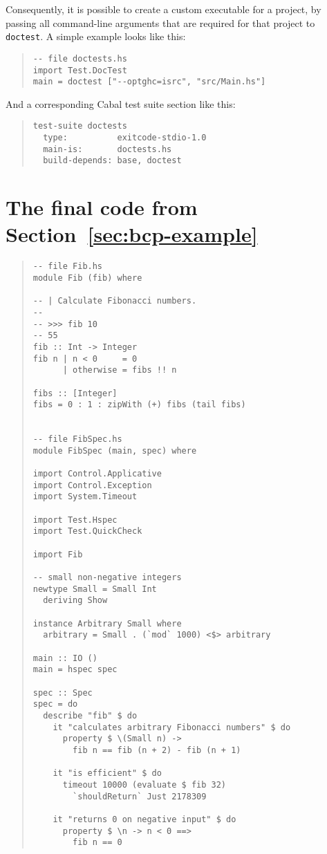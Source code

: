 \documentclass[preprint]{sigplanconf}
\begin{document}
\noindent Consequently, it is possible to create a custom executable
for a project, by passing all command-line arguments that are required
for that project to {\tt doctest}.  A simple example looks like this:

\begin{quote}
\small
\begin{verbatim}
-- file doctests.hs
import Test.DocTest
main = doctest ["--optghc=isrc", "src/Main.hs"]
\end{verbatim}
\end{quote}

\noindent And a corresponding Cabal test suite section like this:

\begin{quote}
\small
\begin{verbatim}
test-suite doctests
  type:          exitcode-stdio-1.0
  main-is:       doctests.hs
  build-depends: base, doctest
\end{verbatim}
\end{quote}

\appendix
\section{The final code from Section~\ref{sec:bcp-example}}
\label{sec:appendix-code}

\begin{quote}
\small
\begin{verbatim}
-- file Fib.hs
module Fib (fib) where

-- | Calculate Fibonacci numbers.
--
-- >>> fib 10
-- 55
fib :: Int -> Integer
fib n | n < 0     = 0
      | otherwise = fibs !! n

fibs :: [Integer]
fibs = 0 : 1 : zipWith (+) fibs (tail fibs)


-- file FibSpec.hs
module FibSpec (main, spec) where

import Control.Applicative
import Control.Exception
import System.Timeout

import Test.Hspec
import Test.QuickCheck

import Fib

-- small non-negative integers
newtype Small = Small Int
  deriving Show

instance Arbitrary Small where
  arbitrary = Small . (`mod` 1000) <$> arbitrary

main :: IO ()
main = hspec spec

spec :: Spec
spec = do
  describe "fib" $ do
    it "calculates arbitrary Fibonacci numbers" $ do
      property $ \(Small n) ->
        fib n == fib (n + 2) - fib (n + 1)

    it "is efficient" $ do
      timeout 10000 (evaluate $ fib 32)
        `shouldReturn` Just 2178309

    it "returns 0 on negative input" $ do
      property $ \n -> n < 0 ==>
        fib n == 0
\end{verbatim}
\end{quote}



\end{document}
